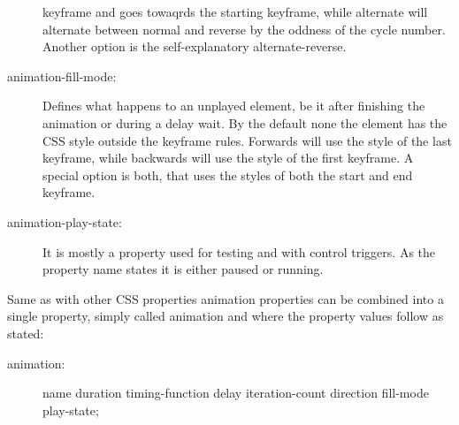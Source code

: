 \begin{description}
keyframe and goes towaqrds the starting keyframe, while alternate will 
alternate between normal and reverse by the oddness of the cycle number. 
Another option is the self-explanatory alternate-reverse.
\item [animation-fill-mode:] Defines what happens to an unplayed element, be it 
after finishing the animation or during a delay wait. By the default none the 
element has the CSS style outside the keyframe rules. Forwards will use the 
style of the last keyframe, while backwards will use the style of the first 
keyframe. A special option is both, that uses the styles of both the start and 
end keyframe.
\item [animation-play-state:] It is mostly a property used for testing and with 
control triggers. As the property name states it is either paused or running.
\end{description}

Same as with other CSS properties animation properties can be combined into a 
single property, simply called animation and where the property values follow 
as stated:

\begin{description}
\item [animation:] name duration timing-function delay iteration-count 
direction fill-mode play-state;
\end{description}

